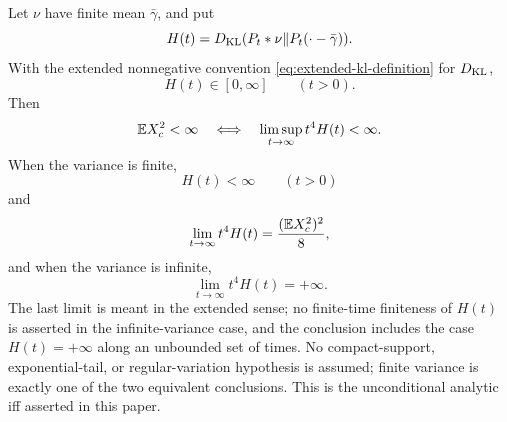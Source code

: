 \begin{theorem}%
\label{thm:sharp-leading-kl-variance-threshold}
Let \(\nu\) have finite mean \(\bar{\gamma}\), and put
\[
H(t)=D_{\rm KL}(P_t*\nu\|P_t(\cdot-\bar{\gamma})).
\]
With the extended nonnegative convention
\eqref{eq:extended-kl-definition} for \(D_{\rm KL}\),
\[
H(t)\in[0,\infty]\qquad(t>0).
\]
Then
\[
\mathbb{E} X_c^2<\infty
\quad\Longleftrightarrow\quad
\limsup_{t\to\infty}t^4H(t)<\infty .
\]
When the variance is finite,
\[
H(t)<\infty\qquad(t>0)
\]
and
\[
\lim_{t\to\infty}t^4H(t)=\frac{(\mathbb{E} X_c^2)^2}{8},
\]
and when the variance is infinite,
\[
\lim_{t\to\infty}t^4H(t)=+\infty .
\]
The last limit is meant in the extended sense; no finite-time finiteness of
\(H(t)\) is asserted in the infinite-variance case, and the conclusion
includes the case \(H(t)=+\infty\) along an unbounded set of times.
No compact-support, exponential-tail, or regular-variation hypothesis is
assumed; finite variance is exactly one of the two equivalent conclusions.
This is the unconditional analytic iff asserted in this paper.
\end{theorem}


